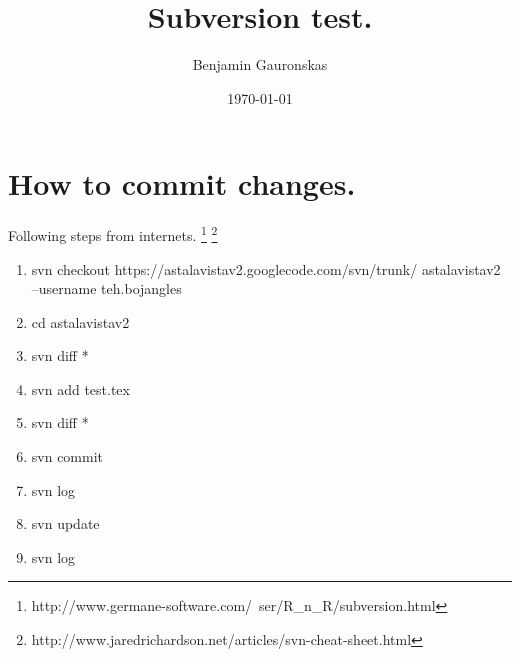 \documentclass[12pt]{article}
\title{Subversion test.}
\author{Benjamin Gauronskas}
\date{\today}
\begin{document}
\maketitle
\doublespacing

\section{How to commit changes.}

Following steps from internets.
\footnote{http://www.germane-software.com/~ser/R\_n\_R/subversion.html}
\footnote{http://www.jaredrichardson.net/articles/svn-cheat-sheet.html}

\begin{enumerate}
\item svn checkout https://astalavistav2.googlecode.com/svn/trunk/ 
		astalavistav2 --username teh.bojangles
\item cd astalavistav2
\item svn diff *
\item svn add test.tex
\item svn diff *
\item svn commit
\item svn log
\item svn update
\item svn log


\end{enumerate}
\end{document}

